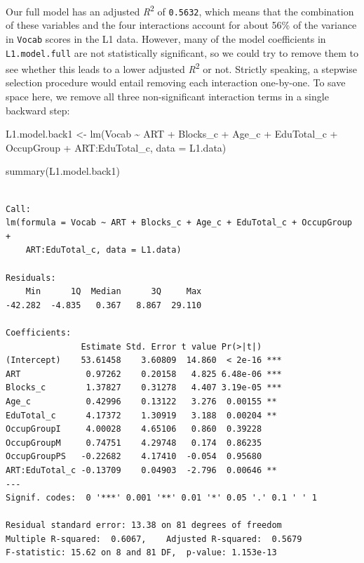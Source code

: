 \documentclass[
  letterpaper,
  DIV=11,
  numbers=noendperiod]{scrreprt}
\newenvironment{Shaded}{\begin{snugshade}}{\end{snugshade}}
\newcommand{\AttributeTok}[1]{\textcolor[rgb]{0.40,0.45,0.13}{#1}}
\newcommand{\FunctionTok}[1]{\textcolor[rgb]{0.28,0.35,0.67}{#1}}
\newcommand{\NormalTok}[1]{\textcolor[rgb]{0.00,0.23,0.31}{#1}}
\newcommand{\OtherTok}[1]{\textcolor[rgb]{0.00,0.23,0.31}{#1}}
\newcommand{\SpecialCharTok}[1]{\textcolor[rgb]{0.37,0.37,0.37}{#1}}
\begin{document}
Our full model has an adjusted \emph{R}\textsuperscript{2} of
\texttt{0.5632}, which means that the combination of these variables and
the four interactions account for about 56\% of the variance in
\texttt{Vocab} scores in the L1 data. However, many of the model
coefficients in \texttt{L1.model.full} are not statistically
significant, so we could try to remove them to see whether this leads to
a lower adjusted \emph{R}\textsuperscript{2} or not. Strictly speaking,
a stepwise selection procedure would entail removing each interaction
one-by-one. To save space here, we remove all three non-significant
interaction terms in a single backward step:

\begin{Shaded}
\begin{Highlighting}[]
\NormalTok{L1.model.back1 }\OtherTok{\textless{}{-}} \FunctionTok{lm}\NormalTok{(Vocab }\SpecialCharTok{\textasciitilde{}}\NormalTok{ ART }\SpecialCharTok{+}\NormalTok{ Blocks\_c }\SpecialCharTok{+}\NormalTok{ Age\_c }\SpecialCharTok{+}\NormalTok{ EduTotal\_c }\SpecialCharTok{+}\NormalTok{ OccupGroup }\SpecialCharTok{+}\NormalTok{ ART}\SpecialCharTok{:}\NormalTok{EduTotal\_c, }
           \AttributeTok{data =}\NormalTok{ L1.data)}

\FunctionTok{summary}\NormalTok{(L1.model.back1)}
\end{Highlighting}
\end{Shaded}

\begin{verbatim}

Call:
lm(formula = Vocab ~ ART + Blocks_c + Age_c + EduTotal_c + OccupGroup + 
    ART:EduTotal_c, data = L1.data)

Residuals:
    Min      1Q  Median      3Q     Max 
-42.282  -4.835   0.367   8.867  29.110 

Coefficients:
               Estimate Std. Error t value Pr(>|t|)    
(Intercept)    53.61458    3.60809  14.860  < 2e-16 ***
ART             0.97262    0.20158   4.825 6.48e-06 ***
Blocks_c        1.37827    0.31278   4.407 3.19e-05 ***
Age_c           0.42996    0.13122   3.276  0.00155 ** 
EduTotal_c      4.17372    1.30919   3.188  0.00204 ** 
OccupGroupI     4.00028    4.65106   0.860  0.39228    
OccupGroupM     0.74751    4.29748   0.174  0.86235    
OccupGroupPS   -0.22682    4.17410  -0.054  0.95680    
ART:EduTotal_c -0.13709    0.04903  -2.796  0.00646 ** 
---
Signif. codes:  0 '***' 0.001 '**' 0.01 '*' 0.05 '.' 0.1 ' ' 1

Residual standard error: 13.38 on 81 degrees of freedom
Multiple R-squared:  0.6067,    Adjusted R-squared:  0.5679 
F-statistic: 15.62 on 8 and 81 DF,  p-value: 1.153e-13
\end{verbatim}
\end{document}
